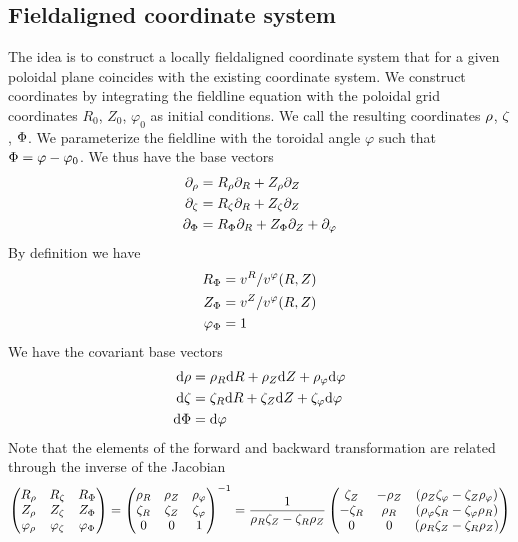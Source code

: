 \subsection{Fieldaligned coordinate system}
The idea is to construct a locally fieldaligned coordinate system that
for a given poloidal plane coincides with the existing coordinate system.
We construct coordinates by integrating the fieldline equation with
 the poloidal grid coordinates $R_0$, $Z_0$, $\varphi_0$ as initial conditions.
 We call the resulting coordinates ${\rho}$, ${\zeta}$, ${\Phi}$.
 We parameterize the fieldline with the toroidal angle $\varphi$ such that ${\Phi} = \varphi-\varphi_0$.
 We thus have the base vectors
 \begin{align}
 \partial_{\rho} &= R_{\rho} \partial_R + Z_{\rho}\partial_Z \\
 \partial_{\zeta} &= R_{\zeta} \partial_R + Z_{\zeta}\partial_Z \\
 \partial_{\Phi} &= R_{\Phi} \partial_R + Z_{\Phi}\partial_Z + \partial_\varphi
 \end{align}
 By definition we have
 \begin{align}
 R_{\Phi} &= v^R/v^\varphi(R,Z) \\
 Z_{\Phi} &= v^Z/v^\varphi(R,Z) \\
 \varphi_{\Phi} &= 1
 \end{align}
 We have the covariant base vectors
 \begin{align}
\mathrm{d} {\rho} &= {\rho}_R\mathrm{d} R  + {\rho}_Z \mathrm{d} Z + {\rho}_\varphi \mathrm{d}\varphi \\
\mathrm{d} {\zeta} &= {\zeta}_R\mathrm{d} R  + {\zeta}_Z \mathrm{d} Z + {\zeta}_\varphi \mathrm{d}\varphi \\
\mathrm{d} {\Phi} &=  \mathrm{d}\varphi
\end{align}
Note that the elements of the forward and backward transformation are related through the
inverse of the Jacobian
\begin{align}
\begin{pmatrix}
R_{\rho} & R_{\zeta} & R_{\Phi} \\
Z_{\rho} & Z_{\zeta} & Z_{\Phi} \\
\varphi_{\rho} & \varphi_{\zeta} & \varphi_{\Phi}
\end{pmatrix}
=
\begin{pmatrix}
{\rho}_R & {\rho}_Z & {\rho}_\varphi \\
{\zeta}_R & {\zeta}_Z & {\zeta}_\varphi \\
0 & 0 & 1
\end{pmatrix}^{-1}
=
\frac{1}{{\rho}_R {\zeta}_Z - {\zeta}_R {\rho}_Z}
\begin{pmatrix}
 {\zeta}_Z & -{\rho}_Z & ({\rho}_Z {\zeta}_\varphi - {\zeta}_Z{\rho}_\varphi) \\
 -{\zeta}_R & {\rho}_R &  ({\rho}_\varphi {\zeta}_R - {\zeta}_\varphi {\rho}_R) \\
0 & 0 & ({\rho}_R {\zeta}_Z - {\zeta}_R {\rho}_Z)
\end{pmatrix}
\end{align}
